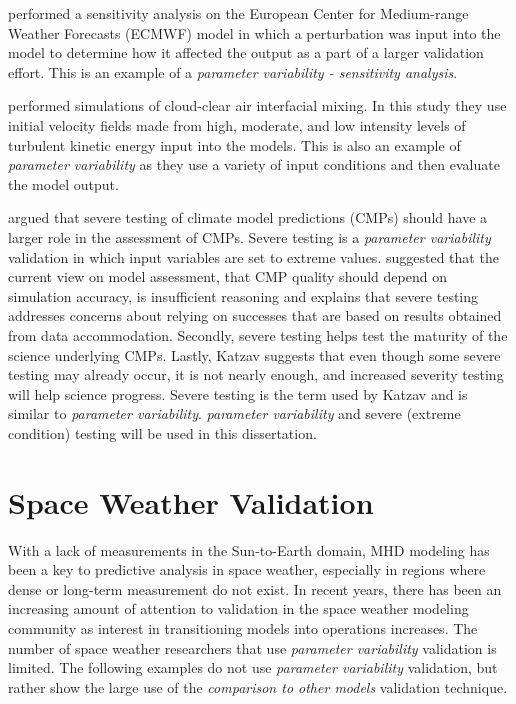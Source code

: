 \citet{Molteni1996} performed a sensitivity analysis on the European
Center for Medium-range Weather Forecasts (ECMWF) model in which a perturbation was input
into the model to determine how it affected the output as a part of
a larger validation effort. This is an example of a \textit{parameter
variability - sensitivity analysis}.

\citet{Andrejczuk2006} performed simulations of cloud-clear air
interfacial mixing. In this study they use initial velocity fields made from high, moderate,
and low intensity levels of turbulent kinetic energy input into the models. This
is also an example of \textit{parameter variability} as they use a variety of input
conditions and then evaluate the model output.

\citet{Katzav2011} argued that severe testing of climate model
predictions (CMPs) should have a larger role in the assessment of CMPs. Severe testing is a
\textit{parameter variability} validation in which input variables are set to
extreme values.
\citet{Katzav2011} suggested that the current view on model assessment, that CMP
quality should depend on simulation accuracy, is insufficient reasoning and explains
that severe testing addresses concerns about relying on successes that are
based on results obtained from data accommodation. Secondly, severe testing
helps test the maturity of the science underlying CMPs. Lastly, Katzav suggests
that even though some severe testing may already occur, it is not nearly enough,
and increased severity testing will help science progress. Severe testing is
the term used by Katzav and is similar to \textit{parameter variability}.
\textit{parameter variability} and severe (extreme condition) testing will be used in this
dissertation.

\section{Space Weather Validation}
\label{SpaceWeatherVV}
With a lack of measurements in the Sun-to-Earth domain, MHD modeling has been a
key to predictive analysis in space weather, especially in regions where dense
or long-term measurement do not exist. In recent years, there has been an
increasing amount of attention to validation in the space weather modeling community
as interest in transitioning models into operations increases. The number
of space weather researchers that use \textit{parameter variability} validation is limited. The
following examples do not use \textit{parameter variability} validation, but
rather show the large use of the \textit{comparison to other models} validation technique.

